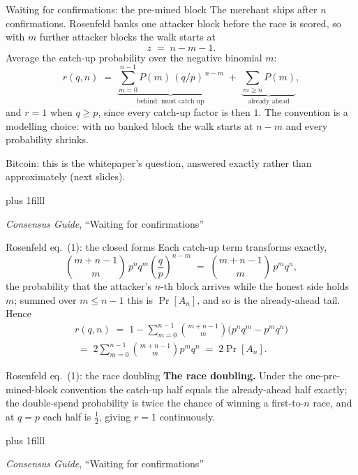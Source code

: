\documentclass[aspectratio=169,11pt]{beamer}
\newcommand{\src}[1]{\par\vskip0pt plus 1filll
  {\fontsize{6}{7.2}\selectfont\color{arbdim}\raggedright #1\par}}
\begin{document}
\begin{frame}{Waiting for confirmations: the pre-mined block}
The merchant ships after $n$ confirmations. Rosenfeld banks one
attacker block before the race is scored, so with $m$ further attacker
blocks the walk starts at
\[
  z \;=\; n - m - 1 .
\]
Average the catch-up probability over the negative binomial $m$:
\[
  r(q, n)
  \;=\; \underbrace{\sum_{m=0}^{n-1} P(m)\,(q/p)^{\,n-m}}_{
    \text{behind: must catch up}}
  \;+\; \underbrace{\sum_{m \geq n} P(m)}_{\text{already ahead}},
\]
and $r = 1$ when $q \geq p$, since every catch-up factor is then $1$.
The convention is a modelling choice: with no banked block the walk
starts at $n - m$ and every probability shrinks.
\medskip

\alert{Bitcoin:} this is the whitepaper's question, answered exactly
rather than approximately (next slides).
\src{\emph{Consensus Guide}, ``Waiting for confirmations''}
\end{frame}

\begin{frame}{Rosenfeld eq.~(1): the closed forms}
Each catch-up term transforms exactly,
\[
  \binom{m+n-1}{m}\, p^{n} q^{m} \left( \frac{q}{p} \right)^{\!n-m}
  \;=\; \binom{m+n-1}{m}\, p^{m} q^{n},
\]
the probability that the attacker's $n$-th block arrives while the
honest side holds $m$; summed over $m \leq n - 1$ this is $\Pr[A_n]$,
and so is the already-ahead tail. Hence
\begin{gather*}
  r(q, n)
  \;=\; 1 - \sum_{m=0}^{n-1} \binom{m+n-1}{m}
        \bigl( p^{n} q^{m} - p^{m} q^{n} \bigr) \\
  \;=\; 2 \sum_{m=0}^{n-1} \binom{m+n-1}{m} p^{m} q^{n}
  \;=\; 2 \Pr[A_n] .
\end{gather*}
\end{frame}

\begin{frame}{Rosenfeld eq.~(1): the race doubling}
\textbf{The race doubling.} Under the one-pre-mined-block convention
the catch-up half equals the already-ahead half exactly; the
double-spend probability is twice the chance of winning a first-to-$n$
race, and at $q = p$ each half is $\tfrac12$, giving $r = 1$
continuously.
\src{\emph{Consensus Guide}, ``Waiting for confirmations''}
\end{frame}
\end{document}
